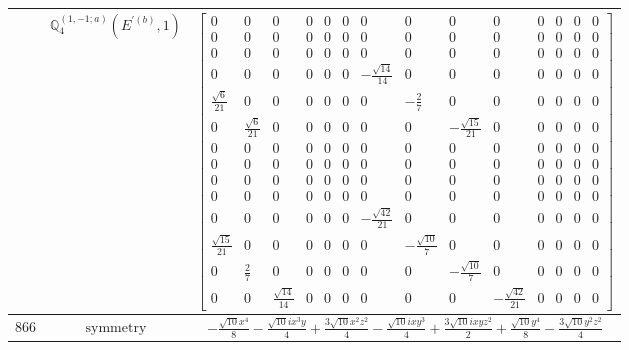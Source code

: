 \documentclass[fleqn,8pt,landscape]{jsarticle}
\begin{document}
\begin{longtable}{ccc}
$  $ & $ \mathbb{Q}_{4}^{(1,-1;a)}(E^{\prime(b)},1) $ & $ \begin{bmatrix} 0 & 0 & 0 & 0 & 0 & 0 & 0 & 0 & 0 & 0 & 0 & 0 & 0 & 0 \\ 0 & 0 & 0 & 0 & 0 & 0 & 0 & 0 & 0 & 0 & 0 & 0 & 0 & 0 \\ 0 & 0 & 0 & 0 & 0 & 0 & 0 & 0 & 0 & 0 & 0 & 0 & 0 & 0 \\ 0 & 0 & 0 & 0 & 0 & 0 & - \frac{\sqrt{14}}{14} & 0 & 0 & 0 & 0 & 0 & 0 & 0 \\ \frac{\sqrt{6}}{21} & 0 & 0 & 0 & 0 & 0 & 0 & - \frac{2}{7} & 0 & 0 & 0 & 0 & 0 & 0 \\ 0 & \frac{\sqrt{6}}{21} & 0 & 0 & 0 & 0 & 0 & 0 & - \frac{\sqrt{15}}{21} & 0 & 0 & 0 & 0 & 0 \\ 0 & 0 & 0 & 0 & 0 & 0 & 0 & 0 & 0 & 0 & 0 & 0 & 0 & 0 \\ 0 & 0 & 0 & 0 & 0 & 0 & 0 & 0 & 0 & 0 & 0 & 0 & 0 & 0 \\ 0 & 0 & 0 & 0 & 0 & 0 & 0 & 0 & 0 & 0 & 0 & 0 & 0 & 0 \\ 0 & 0 & 0 & 0 & 0 & 0 & 0 & 0 & 0 & 0 & 0 & 0 & 0 & 0 \\ 0 & 0 & 0 & 0 & 0 & 0 & - \frac{\sqrt{42}}{21} & 0 & 0 & 0 & 0 & 0 & 0 & 0 \\ \frac{\sqrt{15}}{21} & 0 & 0 & 0 & 0 & 0 & 0 & - \frac{\sqrt{10}}{7} & 0 & 0 & 0 & 0 & 0 & 0 \\ 0 & \frac{2}{7} & 0 & 0 & 0 & 0 & 0 & 0 & - \frac{\sqrt{10}}{7} & 0 & 0 & 0 & 0 & 0 \\ 0 & 0 & \frac{\sqrt{14}}{14} & 0 & 0 & 0 & 0 & 0 & 0 & - \frac{\sqrt{42}}{21} & 0 & 0 & 0 & 0 \end{bmatrix} $ \\ \hline
$ 866 $ & $ \text{symmetry} $ & $ - \frac{\sqrt{10} x^{4}}{8} - \frac{\sqrt{10} i x^{3} y}{4} + \frac{3 \sqrt{10} x^{2} z^{2}}{4} - \frac{\sqrt{10} i x y^{3}}{4} + \frac{3 \sqrt{10} i x y z^{2}}{2} + \frac{\sqrt{10} y^{4}}{8} - \frac{3 \sqrt{10} y^{2} z^{2}}{4} $ \\

\end{longtable}
\end{document}
